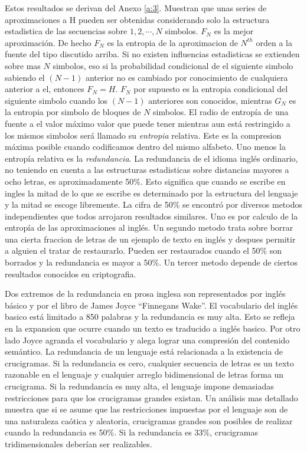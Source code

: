 Estos resultados se derivan del Anexo \ref{a:3}. Muestran que
unas series de aproximaciones a H pueden ser obtenidas considerando
solo la estructura estadistica de las secuencias sobre $1, 2, \cdots,
N$ simbolos. $F_{N}$ es la mejor aproximaci\'{o}n. De hecho $F_{N}$ es
la entropia de la aproximacion de $N^{th}$ orden a la fuente del tipo
discutido arriba. Si no existen influencias estadisticas se extienden
sobre mas $N$ simbolos, eso si la probabilidad condicional de el
siguiente simbolo sabiendo el $(N-1)$ anterior no es cambiado por
conocimiento de cualquiera anterior a el, entonces $F_{N} =
H$. $F_{N}$ por supuesto es la entropia condicional del siguiente
simbolo cuando los $(N-1)$ anteriores son conocidos, mientras $G_{N}$
es la entropia por simbolo de bloques de $N$ simbolos.  El radio de
entrop\'{i}a de una fuente a el valor m\'{a}ximo valor que puede tener
mientras aun est\'{a} restringido a los mismos simbolos ser\'{a}
llamado su \textit{entropia} relativa. Este es la compresion
m\'{a}xima posible cuando codificamos dentro del mismo alfabeto. Uno
menos la entrop\'{i}a relativa es la \textit{redundancia}. La
redundancia de el idioma ingl\'{e}s ordinario, no teniendo en cuenta a
las estructuras estadisticas sobre distancias mayores a ocho letras,
es aproximadamente 50\%. Esto significa que cuando se escribe en
ingles la mitad de lo que se escribe es determinado por la estructura
del lenguaje y la mitad se escoge libremente. La cifra de 50\% se
encontr\'{o} por diversos metodos independientes que todos arrojaron
resultados similares. Uno es por calculo de la entrop\'{i}a de las
aproximaciones al ingl\'{e}s. Un segundo metodo trata sobre borrar una
cierta fraccion de letras de un ejemplo de texto en ingl\'{e}s y
despues permitir a alguien el tratar de restaurarlo. Pueden ser
restaurados cuando el 50\% son borrados y la redundancia es mayor a
50\%. Un tercer metodo depende de ciertos resultados conocidos en criptografia.

Dos extremos de la redundancia en prosa inglesa son representados por
ingl\'{e}s b\'{a}sico y por el libro de James Joyce ``Finnegans
Wake''. El vocabulario del ingl\'{e}s basico est\'{a} limitado a 850
palabras y la redundancia es muy alta. Esto se refleja en la expansion
que ocurre cuando un texto es traducido a ingl\'{e}s basico. Por otro
lado Joyce agranda el vocabulario y alega lograr una compresi\'{o}n
del contenido sem\'{a}ntico.  La redundancia de un lenguaje est\'{a}
relacionada a la existencia de crucigramas. Si la redundancia es cero,
cualquier secuencia de letras es un texto razonable en el lenguaje y
cualquier arreglo bidimensional de letras forma un crucigrama. Si la
redundancia es muy alta, el lenguaje impone demasiadas restricciones
para que los crucigramas grandes existan. Un an\'{a}lisis mas
detallado muestra que si se asume que las restricciones impuestas por
el lenguaje son de una naturaleza ca\'{o}tica y aleatoria, crucigramas
grandes son posibles de realizar cuando la redundancia es 50\%. Si la
redundancia es 33\%, crucigramas tridimensionales deber\'{i}an ser
realizables.

\clearpage
